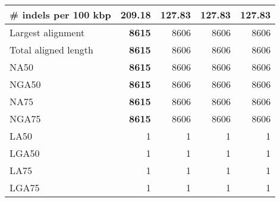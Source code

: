 \documentclass[12pt,a4paper]{article}
\begin{document}
\begin{table}[ht]
\begin{center}
\begin{tabular}{|l*{4}{|r}|}
\# indels per 100 kbp & 209.18 & {\bf 127.83} & {\bf 127.83} & {\bf 127.83} \\ \hline
Largest alignment & {\bf 8615} & 8606 & 8606 & 8606 \\ \hline
Total aligned length & {\bf 8615} & 8606 & 8606 & 8606 \\ \hline
NA50 & {\bf 8615} & 8606 & 8606 & 8606 \\ \hline
NGA50 & {\bf 8615} & 8606 & 8606 & 8606 \\ \hline
NA75 & {\bf 8615} & 8606 & 8606 & 8606 \\ \hline
NGA75 & {\bf 8615} & 8606 & 8606 & 8606 \\ \hline
LA50 & 1 & 1 & 1 & 1 \\ \hline
LGA50 & 1 & 1 & 1 & 1 \\ \hline
LA75 & 1 & 1 & 1 & 1 \\ \hline
LGA75 & 1 & 1 & 1 & 1 \\ \hline
\end{tabular}
\end{center}
\end{table}
\end{document}
